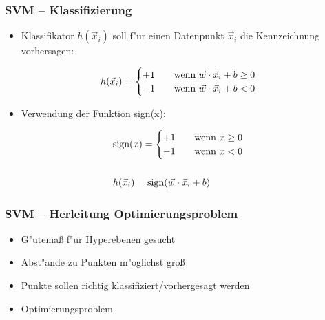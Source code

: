 
\begin{frame}

\frametitle{SVM -- Klassifizierung}

\begin{itemize}
	\item Klassifikator $h(\vec{x}_i)$ soll f"ur einen Datenpunkt $\vec{x}_i$ die Kennzeichnung vorhersagen:
\end{itemize}

\begin{equation}
		h(\vec{x}_i) =
  			\begin{cases}
    			+1       & \quad \textrm{wenn } \vec{w}\cdot\vec{x}_i + b \geq 0\\
    			-1  	 & \quad \textrm{wenn } \vec{w}\cdot\vec{x}_i + b < 0  \notag
  		\end{cases}
\end{equation}

\begin{itemize}
	\item Verwendung der Funktion \textrm{sign(x)}:
\end{itemize}

\begin{align}
	& \textrm{sign}(x) =
  		\begin{cases}
   			+1       & \quad \textrm{wenn } x \geq 0\\
   			-1  	 & \quad \textrm{wenn } x < 0
  		\end{cases} \notag \\
  		\notag \\
 	& h(\vec{x}_i) = \textrm{sign}(\vec{w}\cdot\vec{x}_i+b) \notag
\end{align}


\end{frame}






\begin{frame}

\frametitle{SVM -- Herleitung Optimierungsproblem}

\begin{itemize}
	\setlength{\itemsep}{10pt}
	\item G"utema{\ss} f"ur Hyperebenen gesucht
	\item Abst"ande zu Punkten m"oglichst gro{\ss}
	\item Punkte sollen richtig klassifiziert/vorhergesagt werden
	\item Optimierungsproblem
\end{itemize}

\end{frame}




